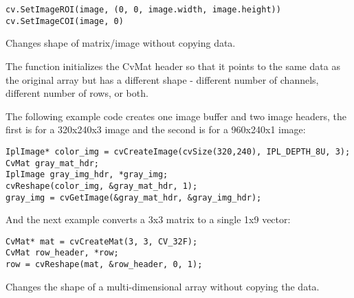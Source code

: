 \begin{lstlisting}
cv.SetImageROI(image, (0, 0, image.width, image.height))
cv.SetImageCOI(image, 0)
\end{lstlisting}
\fi


Changes shape of matrix/image without copying data.


\begin{description}
\ifC
{}
\fi
{}
\end{description}

The function initializes the CvMat header so that it points to the same data as the original array but has a different shape - different number of channels, different number of rows, or both.

\ifC
The following example code creates one image buffer and two image headers, the first is for a 320x240x3 image and the second is for a 960x240x1 image:

\begin{lstlisting}
IplImage* color_img = cvCreateImage(cvSize(320,240), IPL_DEPTH_8U, 3);
CvMat gray_mat_hdr;
IplImage gray_img_hdr, *gray_img;
cvReshape(color_img, &gray_mat_hdr, 1);
gray_img = cvGetImage(&gray_mat_hdr, &gray_img_hdr);
\end{lstlisting}

And the next example converts a 3x3 matrix to a single 1x9 vector:

\begin{lstlisting}
CvMat* mat = cvCreateMat(3, 3, CV_32F);
CvMat row_header, *row;
row = cvReshape(mat, &row_header, 0, 1);
\end{lstlisting}
\fi

Changes the shape of a multi-dimensional array without copying the data.


